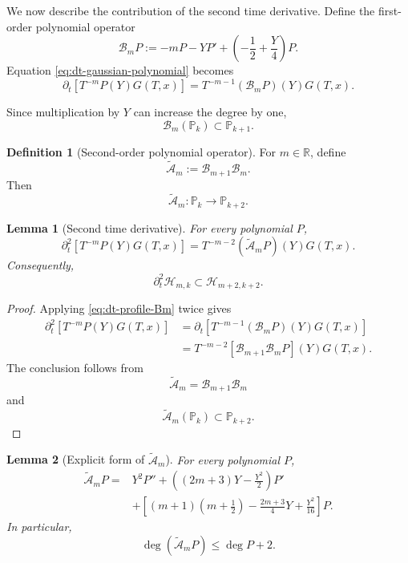 \documentclass[11pt]{amsart}
\newtheorem{lemma}{Lemma}[section]
\theoremstyle{definition}
\newtheorem{Definition}{Definition}[section]
\theoremstyle{remark}
\numberwithin{equation}{section}
\newcommand{\R}{{\mathbb R}}
\begin{document}
We now describe the contribution of the second time derivative. Define
the first-order polynomial operator
\begin{equation}\label{eq:def-Bm}
\mathcal B_mP
:=
-mP-YP'
+
\left(
-\frac12+\frac Y4
\right)P.
\end{equation}
Equation \eqref{eq:dt-gaussian-polynomial} becomes
\begin{equation}\label{eq:dt-profile-Bm}
\partial_t
\left[
T^{-m}P(Y)G(T,x)
\right]
=
T^{-m-1}
(\mathcal B_mP)(Y)G(T,x).
\end{equation}

Since multiplication by $Y$ can increase the degree by one,
\[
\mathcal B_m(\mathbb P_k)
\subset
\mathbb P_{k+1}.
\]

\begin{Definition}[Second-order polynomial operator]
\label{def:tilde-Am}
For $m\in\R$, define
\begin{equation}\label{eq:def-tilde-Am}
\widetilde{\mathcal A}_m
:=
\mathcal B_{m+1}\mathcal B_m.
\end{equation}
Then
\[
\widetilde{\mathcal A}_m
:
\mathbb P_k\longrightarrow\mathbb P_{k+2}.
\]
\end{Definition}

\begin{lemma}[Second time derivative]
\label{lem:second-time-derivative-polynomial}
For every polynomial $P$,
\begin{equation}\label{eq:second-time-derivative-profile}
\partial_t^2
\left[
T^{-m}P(Y)G(T,x)
\right]
=
T^{-m-2}
(\widetilde{\mathcal A}_mP)(Y)G(T,x).
\end{equation}
Consequently,
\[
\partial_t^2\mathcal H_{m,k}
\subset
\mathcal H_{m+2,k+2}.
\]
\end{lemma}

\begin{proof}
Applying \eqref{eq:dt-profile-Bm} twice gives
\begin{align*}
\partial_t^2
\left[
T^{-m}P(Y)G(T,x)
\right]
&=
\partial_t
\left[
T^{-m-1}(\mathcal B_mP)(Y)G(T,x)
\right]
\\
&=
T^{-m-2}
\left[
\mathcal B_{m+1}\mathcal B_mP
\right](Y)G(T,x).
\end{align*}
The conclusion follows from
\[
\widetilde{\mathcal A}_m
=
\mathcal B_{m+1}\mathcal B_m
\]
and
\[
\widetilde{\mathcal A}_m(\mathbb P_k)
\subset\mathbb P_{k+2}.
\]
\end{proof}

\begin{lemma}[Explicit form of $\widetilde{\mathcal A}_m$]
\label{lem:explicit-tilde-Am}
For every polynomial $P$,
\begin{align}
\widetilde{\mathcal A}_mP
={}&
Y^2P''
+
\left(
(2m+3)Y-\frac{Y^2}{2}
\right)P'
\nonumber\\
&+
\left[
(m+1)\left(m+\frac12\right)
-
\frac{2m+3}{4}Y
+
\frac{Y^2}{16}
\right]P.
\label{eq:explicit-tilde-Am}
\end{align}
In particular,
\[
\deg(\widetilde{\mathcal A}_mP)
\le
\deg P+2.
\]
\end{lemma}
\end{document}
